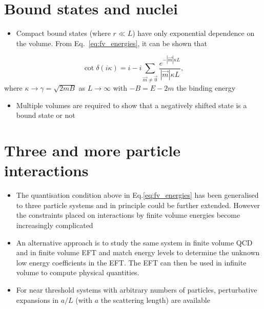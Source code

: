 \section{Bound states and nuclei}
\begin{itemize}
    \item Compact bound states (where $r \ll L$) have only exponential dependence on the volume. From Eq.~\eqref{eq:fv_energies}, it can be shown that
\end{itemize}
\begin{equation}
    \cot \delta(i \kappa) = i - i \sum_{\vec{m}\neq \vec{0}}\frac{e^{- |\vec{m}| \kappa L}}{|\vec{m}|\kappa L},
\end{equation}
where $\kappa \to \gamma = \sqrt{2 m B}$ as $L \to \infty$ with $-B = E-2m$ the binding energy
\begin{itemize}
    \item Multiple volumes are required to show that a negatively shifted state is a bound state or not
\end{itemize}

\section{Three and more particle interactions}
\begin{itemize}
    \item The quantisation condition above in Eq.\eqref{eq:fv_energies} has been generalised to three particle systems and in principle could be further extended. However the constraints placed on interactions by finite volume energies become increasingly complicated
    \item An alternative approach is to study the same system in finite volume QCD and in finite volume EFT and match energy levels to determine the unknown low energy coefficients in the EFT. The EFT can then be used in infinite volume to compute physical quantities.
    \item For near threshold systems with arbitrary numbers of particles, perturbative expansions in $a/L$ (with $a$ the scattering length) are available
\end{itemize}

  	
